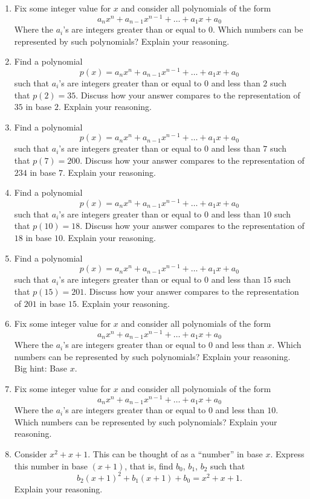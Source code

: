 \begin{problems}
\begin{enumerate}
\item Fix some integer value for $x$ and consider all polynomials of
  the form
\[
a_nx^n + a_{n-1}x^{n-1} + \dots + a_1 x+ a_0
\]
Where the $a_i$'s are integers greater than or equal to $0$. Which
numbers can be represented by such polynomials? Explain your
reasoning.
\item Find a polynomial 
\[
p(x) = a_nx^n + a_{n-1}x^{n-1} + \dots + a_1 x+ a_0
\]
such that $a_i$'s are integers greater than or equal to $0$ and less
than $2$ such that $p(2) = 35$. Discuss how your answer compares to
the representation of $35$ in base $2$. Explain your reasoning.
\item Find a polynomial 
\[
p(x) = a_nx^n + a_{n-1}x^{n-1} + \dots + a_1 x+ a_0
\]
such that $a_i$'s are integers greater than or equal to $0$ and less
than $7$ such that $p(7) = 200$. Discuss how your answer compares to
the representation of $234$ in base $7$. Explain your reasoning. 
\item Find a polynomial 
\[
p(x) = a_nx^n + a_{n-1}x^{n-1} + \dots + a_1 x+ a_0
\]
such that $a_i$'s are integers greater than or equal to $0$ and less
than $10$ such that $p(10) = 18$. Discuss how your answer compares to
the representation of $18$ in base $10$. Explain your reasoning.
\item Find a polynomial 
\[
p(x) = a_nx^n + a_{n-1}x^{n-1} + \dots + a_1 x+ a_0
\]
such that $a_i$'s are integers greater than or equal to $0$ and less
than $15$ such that $p(15) = 201$. Discuss how your answer compares to
the representation of $201$ in base $15$. Explain your reasoning.
\item Fix some integer value for $x$ and consider all polynomials of the form
\[
a_nx^n + a_{n-1}x^{n-1} + \dots + a_1 x+ a_0
\]
Where the $a_i$'s are integers greater than or equal to $0$ and less
than $x$. Which numbers can be represented by such polynomials?
Explain your reasoning. Big hint: Base $x$.
\item Fix some integer value for $x$ and consider all polynomials of
  the form
\[
a_nx^n + a_{n-1}x^{n-1} + \dots + a_1 x+ a_0
\]
Where the $a_i$'s are integers greater than or equal to $0$ and less
than $10$. Which numbers can be represented by such polynomials?
Explain your reasoning.

\item Consider $x^2 + x + 1$. This can be thought of as a ``number'' in
  base $x$. Express this number in base $(x+1)$, that is, find $b_0$, $b_1$, $b_2$ such that 
\[
b_2(x+1)^2 +b_1(x+1) + b_0 = x^2 + x + 1.
\]
Explain your reasoning.


\end{enumerate}
\end{problems}
